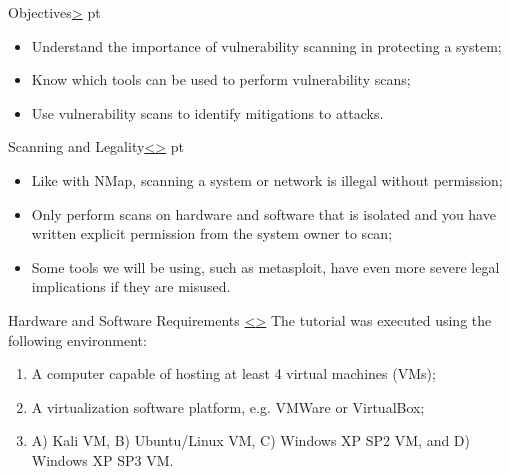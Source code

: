\documentclass[12pt]{extarticle}
\newenvironment{instructionblock}{\Large\bgroup}{\egroup}
\begin{document}
\pagebreak
{}
\setcounter{section}{1}
\begin{slide}{Objectives}{\hyperref[slide 2]{\textgreater}}
	 pt
	\begin{instructionblock}
		\begin{itemize}
			
\item Understand the importance of vulnerability scanning in protecting a system;
\item Know which tools can be used to perform vulnerability scans;
\item Use vulnerability scans to identify mitigations to attacks.
\end{itemize}
	\end{instructionblock}
\end{slide}

\pagebreak
\begin{slide}{Scanning and Legality}{\hyperref[slide 1]{\textless}\hyperref[slide 3]{\textgreater}}
	 pt
	\begin{instructionblock}
		\begin{itemize}
			\item Like with NMap, scanning a system or network is illegal without permission;
			\item Only perform scans on hardware and software that is isolated and you have written explicit permission from the system owner to scan;
			\item Some tools we will be using, such as metasploit, have even more severe legal implications if they are misused.
		\end{itemize}
	\end{instructionblock}
\end{slide}




\pagebreak
\begin{slide}{Hardware and Software Requirements }{\hyperref[slide 2]{\textless}\hyperref[slide 4]{\textgreater} }
	\begin{instructionblock}
		The tutorial was executed using the following environment:
		\begin{enumerate}
			\item A computer capable of hosting at least 4 virtual machines (VMs);
			\item A virtualization software platform, e.g. VMWare or VirtualBox;
			\item A) Kali VM, B) Ubuntu/Linux VM, C) Windows XP SP2 VM, and D) Windows XP SP3 VM.
		\end{enumerate}
	\end{instructionblock}
\end{slide}
\end{document}
